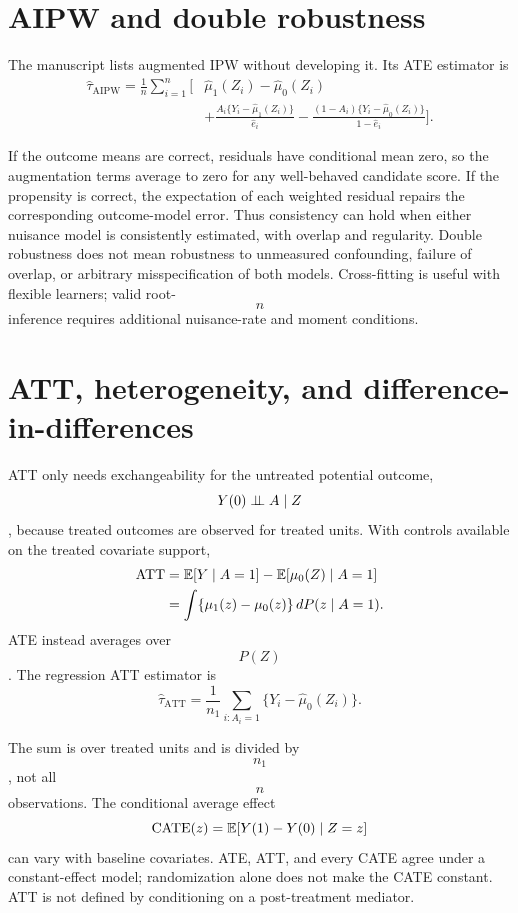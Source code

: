 \section{AIPW and double robustness}
The manuscript lists augmented IPW without developing it. Its ATE estimator is
\begin{align}
\widehat\tau_{\mathrm{AIPW}}=\frac1n\sum_{i=1}^n\Bigg[
&\widehat\mu_1(Z_i)-\widehat\mu_0(Z_i)\\
&+\frac{A_i\{Y_i-\widehat\mu_1(Z_i)\}}{\widehat e_i}
-\frac{(1-A_i)\{Y_i-\widehat\mu_0(Z_i)\}}{1-\widehat e_i}\Bigg].
\end{align}
\begin{supplement}
If the outcome means are correct, residuals have conditional mean zero, so the augmentation terms average to zero for any well-behaved candidate score. If the propensity is correct, the expectation of each weighted residual repairs the corresponding outcome-model error. Thus consistency can hold when either nuisance model is consistently estimated, with overlap and regularity. Double robustness does not mean robustness to unmeasured confounding, failure of overlap, or arbitrary misspecification of both models. Cross-fitting is useful with flexible learners; valid root-$$n$$ inference requires additional nuisance-rate and moment conditions.
\end{supplement}

\section{ATT, heterogeneity, and difference-in-differences}
ATT only needs exchangeability for the untreated potential outcome, $$Y(0)\mathrel{\perp\!\!\!\perp} A\mid Z$$, because treated outcomes are observed for treated units. With controls available on the treated covariate support,
\begin{align}
\operatorname{ATT}&=\mathbb E[Y\mid A=1]-\mathbb E[\mu_0(Z)\mid A=1]\\
&=\int\{\mu_1(z)-\mu_0(z)\}\,dP(z\mid A=1).
\end{align}
ATE instead averages over $$P(Z)$$. The regression ATT estimator is
\begin{equation}
\widehat\tau_{\mathrm{ATT}}=\frac1{n_1}\sum_{i:A_i=1}
\{Y_i-\widehat\mu_0(Z_i)\}.
\end{equation}
\begin{correction}
The sum is over treated units and is divided by $$n_1$$, not all $$n$$ observations. The conditional average effect $$\operatorname{CATE}(z)=\mathbb E[Y(1)-Y(0)\mid Z=z]$$ can vary with baseline covariates. ATE, ATT, and every CATE agree under a constant-effect model; randomization alone does not make the CATE constant. ATT is not defined by conditioning on a post-treatment mediator.
\end{correction}

